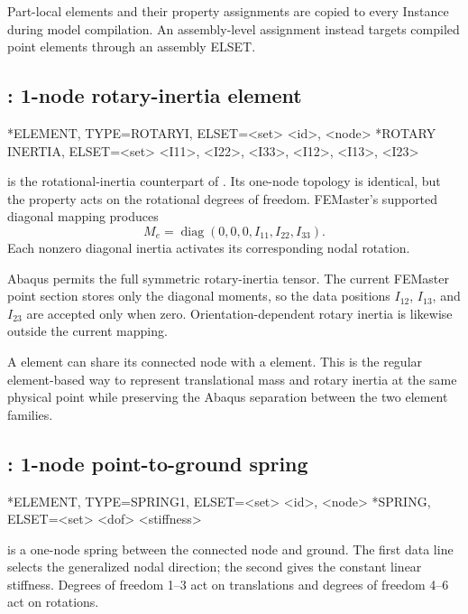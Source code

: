 Part-local  elements and their  property assignments are copied to every Instance during model compilation. An assembly-level  assignment instead targets compiled point elements through an assembly ELSET.

\clearpage
\subsection{: 1-node rotary-inertia element}

\begin{syntax}
*ELEMENT, TYPE=ROTARYI, ELSET=<set>
<id>, <node>
*ROTARY INERTIA, ELSET=<set>
<I11>, <I22>, <I33>, <I12>, <I13>, <I23>
\end{syntax}

 is the rotational-inertia counterpart of . Its one-node topology is identical, but the property acts on the rotational degrees of freedom. FEMaster's supported diagonal mapping produces
\[
M_e=\operatorname{diag}(0,0,0,I_{11},I_{22},I_{33}).
\]
Each nonzero diagonal inertia activates its corresponding nodal rotation.

Abaqus permits the full symmetric rotary-inertia tensor. The current FEMaster point section stores only the diagonal moments, so the data positions \(I_{12}\), \(I_{13}\), and \(I_{23}\) are accepted only when zero. Orientation-dependent rotary inertia is likewise outside the current mapping.

A  element can share its connected node with a  element. This is the regular element-based way to represent translational mass and rotary inertia at the same physical point while preserving the Abaqus separation between the two element families.

\clearpage
\subsection{: 1-node point-to-ground spring}

\begin{syntax}
*ELEMENT, TYPE=SPRING1, ELSET=<set>
<id>, <node>
*SPRING, ELSET=<set>
<dof>
<stiffness>
\end{syntax}

 is a one-node spring between the connected node and ground. The first  data line selects the generalized nodal direction; the second gives the constant linear stiffness. Degrees of freedom 1--3 act on translations and degrees of freedom 4--6 act on rotations.

